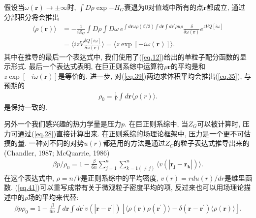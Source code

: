 假设当$\omega(\bm{r})\longrightarrow\pm\infty$时, $\int D\rho
\exp{-H_G}$衰退为0对值域中所有的点$\bm{r}$都成立, 通过分部积分将会推出
\label{subsec.equations}
   \begin{equation}
       \begin{aligned}
           \langle \rho(\bm{r}) \rangle&=-\frac{1}{iZ_G} \int D\rho \int D\omega\
           e^{\int d\bm{r} \omega\rho(\beta/2)\int d\bm{r}\int d\bm{r^{'}}\rho u\rho}
           \frac{\delta}{\delta\omega(\bm{r})} e^{zVQ[i\omega]}
           \\
           &=\langle izV\frac{\delta Q[i\omega]}{\delta\omega(\bm{r})}
           \rangle=\langle z\exp[-i\omega(\bm{r})] \rangle.
       \end{aligned}
       \label{eq.39}      
    \end{equation}
其中在推导的最后一个表达式中,
我们使用了(\ref{eq.12})给出的单粒子配分函数的显示形式. 最后一个表达式表明,
在巨正则系综中运算符$\rho{\bm{r}}$的平均是和$z\exp[-i\omega(\bm{r})]$是等价的.
进一步, 对(\ref{eq.39})两边求体积平均会推出(\ref{eq.35}), 与预期的
\label{subsec.equations}
   \begin{equation}
       \begin{aligned}
           \rho_0=\frac{1}{V}\int d\bm{r}\langle \rho(r) \rangle.
       \end{aligned}
       \label{eq.40}      
    \end{equation}
是保持一致的.
\par
另外一个我们感兴趣的热力学量是压力$p$.
在巨正则系综中, 当$Z_G$可以被计算时, 压力可通过(\ref{eq.28})直接计算出来.
在正则系综的场理论框架中, 压力是一个更不可估摸的量.
一种对不同的对势$u(r)$都适用的方法是通过$Z_C$的粒子表达式推导出来的(Chandler,
1987; McQuarrie, 1986)
\label{subsec.equations}
   \begin{equation}
       \begin{aligned}
           \beta p/\rho_0=1-\frac{\beta}{6n} \sum_{j=1}^{n} \sum_{k=1(\neq j)}^{n} \langle v(|\bm{r_j}-\bm{r_k} |)\rangle.
       \end{aligned}
       \label{eq.41}      
    \end{equation}
在这个表达式中, $\rho=n/V$是正则系综中的平均密度, $v(r)=rdu(r)/dr$是维里函数.
(\ref{eq.41})可以重写成带有关于微观粒子密度平均的项,
反过来也可以用场理论描述中的$\rho$场的平均来代替:
\label{subsec.equations}
   \begin{equation}
       \begin{aligned}
           \beta p\rho_0=1-\frac{\beta}{6n} \int d\bm{r} \int d\bm{r^{'}}
           v(|\bm{r}-\bm{r^{'}} |) [\langle \rho(\bm{r})\rho(\bm{r^{'}})
           \rangle -\delta(\bm{r}-\bm{r^{'}})\langle\rho(\bm{r})\rangle ].
       \end{aligned}
       \label{eq.42}      
    \end{equation}

